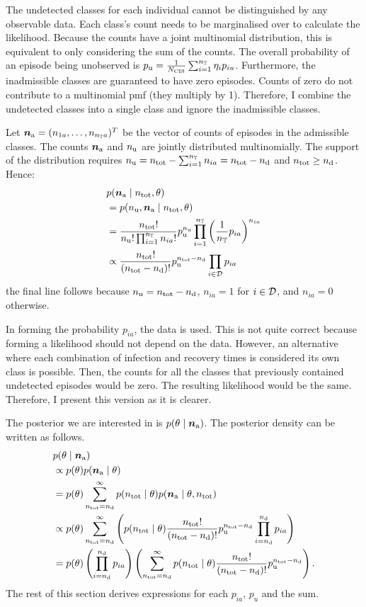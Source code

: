 \documentclass[thesis.tex]{subfiles}
\begin{document}
The undetected classes for each individual cannot be distinguished by any observable data.
Each class's count needs to be marginalised over to calculate the likelihood.
Because the counts have a joint multinomial distribution, this is equivalent to only considering the sum of the counts.
The overall probability of an episode being unobserved is $p_\text{u} = \frac{1}{N_\text{CIS}} \sum_{i=1}^{n_{\mathbb{T}}} \eta_i p_{iu}$.
Furthermore, the inadmissible classes are guaranteed to have zero episodes.
Counts of zero do not contribute to a multinomial pmf (they multiply by 1).
Therefore, I combine the undetected classes into a single class and ignore the inadmissible classes.

Let $\bm{n_\text{a}} = (n_{1a}, \dots, n_{n_{\mathbb{T}} a})^T$ be the vector of counts of episodes in the admissible classes.
The counts $\bm{n_\text{a}}$ and $n_\text{u}$ are jointly distributed multinomially.
The support of the distribution requires $n_\text{u} = n_\text{tot} - \sum_{i=1}^{n_{\mathbb{T}}} n_{ia} = n_\text{tot} - n_\text{d}$ and $n_\text{tot} \geq n_\text{d}$.
Hence:
\begin{align}
&p(\bm{n_\text{a}} \mid n_\text{tot}, \theta) \\
&= p(n_\text{u}, \bm{n_\text{a}}\mid n_\text{tot}, \theta) \\
&= \frac{n_\text{tot}!}{n_\text{u}! \prod_{i=1}^{n_{\mathbb{T}}} n_{ia}!}  p_\text{u}^{n_\text{u}}\prod_{i=1}^{n_{\mathbb{T}}} \left(\frac{1}{n_{\mathbb{T}}}p_{ia}\right)^{n_{ia}} \\
&\propto \frac{n_\text{tot}!}{(n_\text{tot} - n_\text{d})!} p_\text{u}^{n_\text{tot} - n_\text{d}} \prod_{i \in \mathcal{D}} p_{ia} \label{perf-test:eq:augmented-likelihood}
\end{align}
the final line follows because $n_\text{u} = n_\text{tot} - n_\text{d}$, $n_{ia} = 1$ for $i \in \mathcal{D}$, and $n_{ia} = 0$ otherwise.

In forming the probability $p_{ia}$, the data is used.
This is not quite correct because forming a likelihood should not depend on the data.
However, an alternative where each combination of infection and recovery times is considered its own class is possible.
Then, the counts for all the classes that previously contained undetected episodes would be zero.
The resulting likelihood would be the same.
Therefore, I present this version as it is clearer.

The posterior we are interested in is $p(\theta \mid \bm{n_\text{a}})$.
The posterior density can be written as follows.
\begin{align}
&p(\theta \mid \bm{n_\text{a}}) \\
&\propto p(\theta) p(\bm{n_\text{a}} \mid \theta) \\
&= p(\theta) \sum_{n_\text{tot}=n_\text{d}}^\infty p(n_\text{tot} \mid \theta) p(\bm{n_\text{a}} \mid \theta, n_\text{tot}) \\
&\propto p(\theta) \sum_{n_\text{tot}=n_\text{d}}^\infty \left( p(n_\text{tot} \mid \theta) \frac{n_\text{tot}!}{(n_\text{tot} - n_\text{d})!} p_\text{u}^{n_\text{tot} - n_\text{d}} \prod_{i=n_\text{d}}^{n_\text{d}} p_{ia} \right) \\
&= p(\theta) \left( \prod_{i=n_\text{d}}^{n_\text{d}} p_{ia} \right) \left( \sum_{n_\text{tot}=n_\text{d}}^\infty p(n_\text{tot} \mid \theta) \frac{n_\text{tot}!}{(n_\text{tot} - n_\text{d})!} p_\text{u}^{n_\text{tot} - n_\text{d}} \right) \label{perf-test:eq:full-posterior}.
\end{align}
The rest of this section derives expressions for each $p_{ia}$, $p_{u}$ and the sum.
\end{document}
